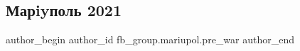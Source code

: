  
 
 
 
 

\subsection{Марiyполь 2021}
\label{sec:14_02_2023.fb.fb_group.mariupol.pre_war.4.mariypol_2021}

\ifcmt
 author_begin
   author_id fb_group.mariupol.pre_war
 author_end
\fi

